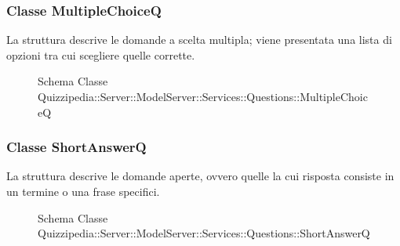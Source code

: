 \subsubsection{Classe MultipleChoiceQ}
La struttura descrive le domande a scelta multipla; viene presentata una lista di opzioni tra cui scegliere quelle corrette.
\begin{figure}[H]
\centering
\noindent{}
\caption[Schema Classe MultipleChoiceQ]{Schema Classe Quizzipedia::Server::ModelServer::Services::Questions::MultipleChoiceQ}
\end{figure}
\subsubsection{Classe ShortAnswerQ}
La struttura descrive le domande aperte, ovvero quelle la cui risposta consiste in un termine o una frase specifici.
\begin{figure}[H]
\centering
\noindent{}
\caption[Schema Classe ShortAnswerQ]{Schema Classe Quizzipedia::Server::ModelServer::Services::Questions::ShortAnswerQ}
\end{figure}
